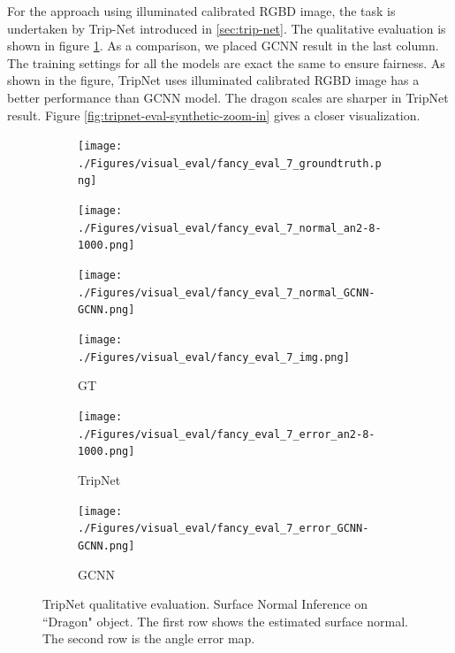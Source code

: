 \documentclass[border=15pt, multi, tikz]{article}
\begin{document}
For the approach using illuminated calibrated RGBD image, the task is undertaken by Trip-Net introduced in \ref{sec:trip-net}. 
The qualitative evaluation is shown in figure \ref{fig:trip-eval}. As a comparison, we placed GCNN result in the last column. The training settings for all the models are exact the same to ensure fairness. As shown in the figure, TripNet uses illuminated calibrated RGBD image has a better performance than GCNN model. The dragon scales are sharper in TripNet result. Figure \ref{fig:tripnet-eval-synthetic-zoom-in} gives a closer visualization.
\begin{figure}[H]
	\centering
	\begin{subfigure}[b]{0.18\linewidth}
		\texttt{[image: ./Figures/visual\_eval/fancy\_eval\_7\_groundtruth.png]}
	\end{subfigure}
	\begin{subfigure}[b]{0.18\linewidth}
		\texttt{[image: ./Figures/visual\_eval/fancy\_eval\_7\_normal\_an2-8-1000.png]}
	\end{subfigure}
	\begin{subfigure}[b]{0.18\linewidth}
	\texttt{[image: ./Figures/visual\_eval/fancy\_eval\_7\_normal\_GCNN-GCNN.png]}
	\end{subfigure}
	
	\begin{subfigure}[b]{0.18\linewidth}
		\texttt{[image: ./Figures/visual\_eval/fancy\_eval\_7\_img.png]}
		\caption{GT}
	\end{subfigure}
	\begin{subfigure}[b]{0.18\linewidth}
		\texttt{[image: ./Figures/visual\_eval/fancy\_eval\_7\_error\_an2-8-1000.png]}
		\caption{TripNet}
	\end{subfigure}
\begin{subfigure}[b]{0.18\linewidth}
	\texttt{[image: ./Figures/visual\_eval/fancy\_eval\_7\_error\_GCNN-GCNN.png]}
	\caption{GCNN}
\end{subfigure}

	
	
	\caption{TripNet qualitative evaluation. Surface Normal Inference on ``Dragon" object. The first row shows the estimated surface normal. The second row is the angle error map.}
	\label{fig:trip-eval}
\end{figure}
\end{document}
